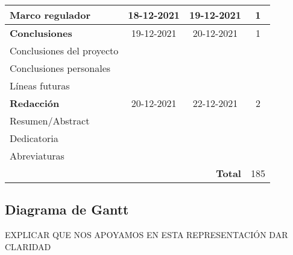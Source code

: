 \begin{longtable}[c]{lcc|c|}
	\multicolumn{1}{|l|}{\textbf{Marco regulador}}       & \multicolumn{1}{c|}{18-12-2021} & 19-12-2021                          & 1   \\ \hline
	\multicolumn{1}{|l|}{\textbf{Conclusiones}}          & \multicolumn{1}{c|}{19-12-2021} & 20-12-2021                          & 1   \\ \hline
	\multicolumn{1}{|l|}{Conclusiones del proyecto}      & \multicolumn{1}{c|}{}           &                                     &     \\ \hline
	\multicolumn{1}{|l|}{Conclusiones personales}        & \multicolumn{1}{c|}{}           &                                     &     \\ \hline
	\multicolumn{1}{|l|}{Líneas futuras}                 & \multicolumn{1}{c|}{}           &                                     &     \\ \hline
	\multicolumn{1}{|l|}{\textbf{Redacción}}             & \multicolumn{1}{c|}{20-12-2021} & 22-12-2021                          & 2   \\ \hline
	\multicolumn{1}{|l|}{Resumen/Abstract}               & \multicolumn{1}{c|}{}           &                                     &     \\ \hline
	\multicolumn{1}{|l|}{Dedicatoria}                    & \multicolumn{1}{c|}{}           &                                     &     \\ \hline
	\multicolumn{1}{|l|}{Abreviaturas}                   & \multicolumn{1}{c|}{}           &                                     &     \\ \hline
	                                                     & \multicolumn{1}{l}{}            & \multicolumn{1}{r|}{\textbf{Total}} & 185 \\ \cline{4-4}
\end{longtable}

\subsection{Diagrama de Gantt}
EXPLICAR QUE NOS APOYAMOS EN ESTA REPRESENTACIÓN DAR CLARIDAD

